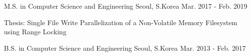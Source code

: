 

\begin{cventries}

  \cventry
    {M.S. in Computer Science and Engineering} %
    {\myuniv{}} %
    {Seoul, S.Korea} %
    {Mar. 2017 - Feb. 2019} %
    {
      \begin{cvitems} %
	\item {Thesis: Single File Write Parallelization of a Non-Volatile Memory Filesystem using Range Locking}
      \end{cvitems}
    }


\end{cventries}




\begin{cventries}
  \cventry
    {B.S. in Computer Science and Engineering} %
    {\myuniv{}	} %
    {Seoul, S.Korea} %
    {Mar. 2013 - Feb. 2017} %
	{}


\end{cventries}